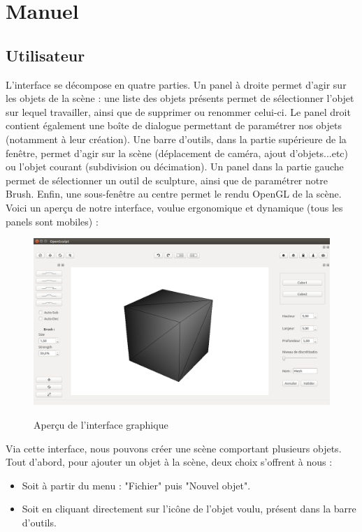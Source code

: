 \documentclass[a4paper]{memoir}
\begin{document}
	\chapter{Manuel}
		
		\section{Utilisateur}

			\label{man-user}
			L'interface se décompose en quatre parties. Un panel à droite permet d'agir sur les objets de la scène : une liste des objets présents permet de 
			sélectionner l'objet sur lequel travailler, ainsi que de supprimer ou renommer celui-ci. Le panel droit contient également une boîte de dialogue 
			permettant de paramétrer nos objets (notamment à leur création). Une barre d'outils, dans la partie supérieure de la fenêtre, permet d'agir 
			sur la scène (déplacement de caméra, ajout d'objets...etc) ou l'objet courant (subdivision ou décimation). Un panel dans la partie gauche permet 
			de sélectionner un outil de sculpture, ainsi que de paramétrer notre Brush. Enfin, une sous-fenêtre au centre permet le rendu OpenGL de la scène.
			\\Voici un aperçu de notre interface, voulue ergonomique et dynamique (tous les panels sont mobiles) :
			\begin{figure}[H]
				\begin{center}
					\includegraphics[scale=0.27]{img/interface.png}
					\label{fig:interface}
					\caption{Aperçu de l'interface graphique}
				\end{center}
			\end{figure}
			Via cette interface, nous pouvons créer une scène comportant plusieurs objets. Tout d'abord, pour ajouter un objet à la scène, deux choix 
			s'offrent à nous :
			\begin{itemize}
				\item Soit à partir du menu : "Fichier" puis  "Nouvel objet".
				\item Soit en cliquant directement sur l'icône de l'objet voulu, présent dans la barre d'outils.
			\end{itemize}
\end{document}
